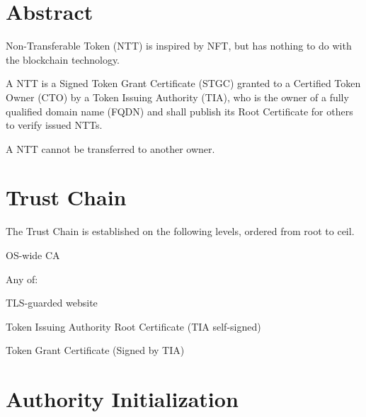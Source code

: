 \documentclass[a4paper,10pt]{article}
\begin{document}

\fulldoctitle












\section*{Abstract}

Non-Transferable Token (NTT) is inspired by NFT, but has nothing to do with the blockchain technology.

A NTT is a Signed Token Grant Certificate (STGC) granted to a Certified Token Owner (CTO) by a Token Issuing Authority (TIA),
who is the owner of a fully qualified domain name (FQDN)
and shall publish its Root Certificate for others to verify issued NTTs.

A NTT cannot be transferred to another owner.



\Nmaketoc












\section{Trust Chain}

The Trust Chain is established on the following levels, ordered from root to ceil.

\begin{compactitem}
	\item OS-wide CA
	\item Any of:
    \item TLS-guarded website
	\item Token Issuing Authority Root Certificate (TIA self-signed)
	\item Token Grant Certificate (Signed by TIA)
\end{compactitem}












\section{Authority Initialization}
\end{document}
